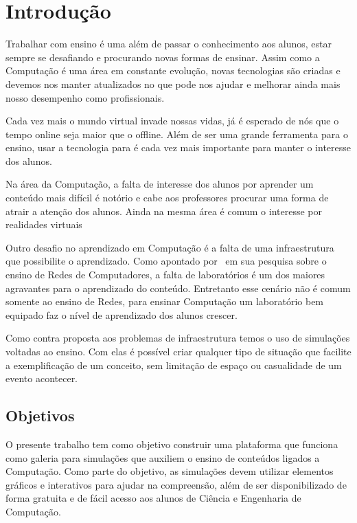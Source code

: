 \documentclass[tcc,capa]{texufpel}
\begin{document}
\tableofcontents

\chapter{Introdução}
\label{cap: introducao}

Trabalhar com ensino é uma além de passar o conhecimento aos alunos, estar sempre se desafiando e procurando novas formas de ensinar. Assim como a Computação é uma área em constante evolução, novas tecnologias são criadas e devemos nos manter atualizados no que pode nos ajudar e melhorar ainda mais nosso desempenho como profissionais. 

Cada vez mais o mundo virtual invade nossas vidas, já é esperado de nós que o tempo online seja maior que o offline. Além de ser uma grande ferramenta para o ensino, usar a tecnologia para é cada vez mais importante para manter o interesse dos alunos. 

Na área da Computação, a falta de interesse dos alunos por aprender um conteúdo mais difícil é notório e cabe aos professores procurar uma forma de atrair a atenção dos alunos. Ainda na mesma área é comum o interesse por realidades virtuais 

Outro desafio no aprendizado em Computação é a falta de uma infraestrutura que possibilite o aprendizado. Como apontado por~\cite{rauen2003abordagem} em sua pesquisa sobre o ensino de Redes de Computadores, a falta de laboratórios é um dos maiores agravantes para o aprendizado do conteúdo. Entretanto esse cenário não é comum somente ao ensino de Redes, para ensinar  Computação um laboratório bem equipado faz o nível de aprendizado dos alunos crescer.

Como contra proposta aos problemas de infraestrutura temos o uso de simulações voltadas ao ensino. Com elas é possível criar qualquer tipo de situação que facilite a exemplificação de um conceito, sem limitação de espaço ou casualidade de um evento acontecer. 

\section{Objetivos}

O presente trabalho tem como objetivo construir uma plataforma que funciona como galeria para simulações que auxiliem o ensino de conteúdos ligados a Computação. Como parte do objetivo, as simulações devem utilizar elementos gráficos e interativos para ajudar na compreensão, além de ser disponibilizado de forma gratuita e de fácil acesso aos alunos de Ciência e Engenharia de Computação.
\end{document}
